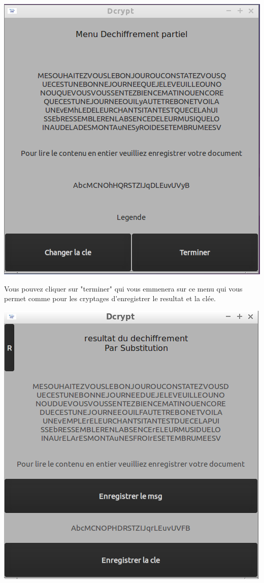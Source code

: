 \documentclass[a4]{article}
\begin{document}
			\begin{center}\includegraphics[scale=0.4]{11.png}\end{center}
			Vous pouvez cliquer sur "terminer" qui vous emmenera sur ce menu qui vous permet comme pour 
 			les cryptages d'enregistrer le resultat et la clée.
			\begin{center}\includegraphics[scale=0.4]{24.PNG}\end{center}
\end{document}
